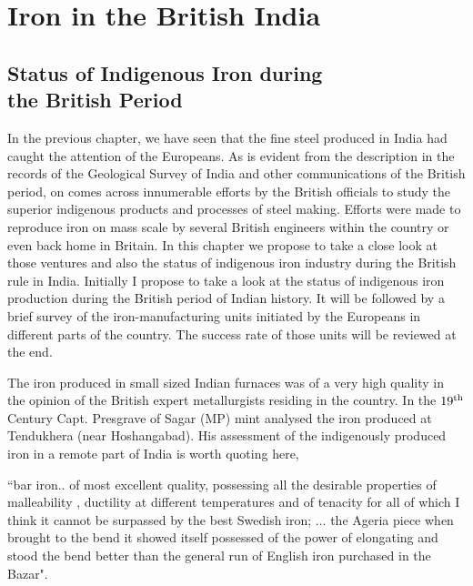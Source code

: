 \chapter{Iron in the British India}\label{chapter6}



\vspace{-.5cm}

\section*{Status of Indigenous Iron during\\ the British Period}\label{chapter6-section-1}

\vspace{-.2cm}

In the previous chapter, we have seen that the fine steel produced in India had caught the attention of the Europeans. As is evident from the description in the records of the Geological Survey of India and other communications of the British period, on comes across innumerable efforts by the British officials to study the superior indigenous products and processes of steel making. Efforts were made to reproduce iron on mass scale by several British engineers within the country or even back home in Britain. In this chapter we propose to take a close look at those ventures and also the status of indigenous iron industry during the British rule in India. Initially I propose to take a look at the status of indigenous iron production during the British period of Indian history. It will be followed by a brief survey of the iron-manufacturing units initiated by the Europeans in different parts of the country. The success rate of those units will be reviewed at the end.

The iron produced in small sized Indian furnaces was of a very high quality in the opinion of the British expert metallurgists residing in the country.  In the $19^{\rm th}$ Century Capt. Presgrave of Sagar (MP) mint analysed the iron produced at Tendukhera (near Hoshangabad).  His assessment of the indigenously produced iron in a remote part of India is worth quoting here,

\footnotesize{``bar iron.. of most excellent quality, possessing all the desirable properties of malleability , ductility at different temperatures and of tenacity for all of which I think it cannot be surpassed by the best Swedish iron; ... the Ageria piece when brought to the bend it showed itself possessed of the power of elongating and stood the bend better than the general run of English iron purchased in the Bazar".}

